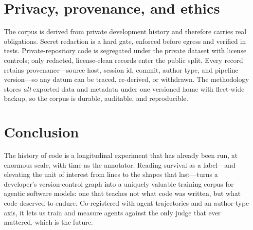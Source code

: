 \documentclass[11pt,letterpaper]{article}
\begin{document}
\section{Privacy, provenance, and ethics}

The corpus is derived from private development history and therefore carries real
obligations. Secret redaction is a hard gate, enforced before egress and verified
in tests. Private-repository code is segregated under the private dataset with
license controls; only redacted, license-clean records enter the public split.
Every record retains provenance---source host, session id, commit, author type,
and pipeline version---so any datum can be traced, re-derived, or withdrawn. The
methodology stores \emph{all} exported data and metadata under one versioned home
with fleet-wide backup, so the corpus is durable, auditable, and reproducible.

\section{Conclusion}

The history of code is a longitudinal experiment that has already been run, at
enormous scale, with time as the annotator. Reading survival as a label---and
elevating the unit of interest from lines to the shapes that last---turns a
developer's version-control graph into a uniquely valuable training corpus for
agentic software models: one that teaches not what code was written, but what
code deserved to endure. Co-registered with agent trajectories and an
author-type axis, it lets us train and measure agents against the only judge
that ever mattered, which is the future.
\end{document}
